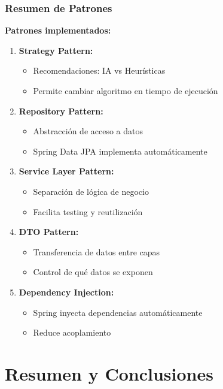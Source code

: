 \documentclass[aspectratio=169]{beamer}
\begin{document}
\begin{frame}
\frametitle{Resumen de Patrones}

\textbf{Patrones implementados:}

\begin{enumerate}
\item \textbf{Strategy Pattern:}
   \begin{itemize}
   \item Recomendaciones: IA vs Heurísticas
   \item Permite cambiar algoritmo en tiempo de ejecución
   \end{itemize}

\item \textbf{Repository Pattern:}
   \begin{itemize}
   \item Abstracción de acceso a datos
   \item Spring Data JPA implementa automáticamente
   \end{itemize}

\item \textbf{Service Layer Pattern:}
   \begin{itemize}
   \item Separación de lógica de negocio
   \item Facilita testing y reutilización
   \end{itemize}

\item \textbf{DTO Pattern:}
   \begin{itemize}
   \item Transferencia de datos entre capas
   \item Control de qué datos se exponen
   \end{itemize}

\item \textbf{Dependency Injection:}
   \begin{itemize}
   \item Spring inyecta dependencias automáticamente
   \item Reduce acoplamiento
   \end{itemize}
\end{enumerate}

\end{frame}

\section{Resumen y Conclusiones}
\end{document}
